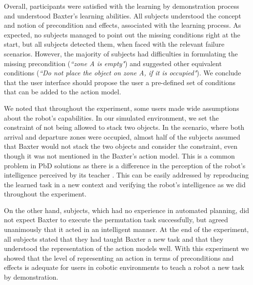 Overall, participants were satisfied with the learning by demonstration process and understood Baxter's learning abilities. All subjects understood the concept and notion of precondition and effects, associated with the learning process. As expected, no subjects managed to point out the missing conditions right at the start, but all subjects detected them, when faced with the relevant failure scenarios. However, the majority of subjects had difficulties in formulating the missing precondition (\textit{``zone A is empty"}) and suggested other equivalent conditions (\textit{``Do not place the object on zone A, if it is occupied"}). We conclude that the user interface should propose the user a pre-defined set of conditions that can be added to the action model.

We noted that throughout the experiment, some users made wide assumptions about the robot's capabilities. In our simulated environment, we set the constraint of not being allowed to stack two objects. In the scenario, where both arrival and departure zones were occupied, almost half of the subjects assumed that Baxter would not stack the two objects and consider the constraint, even though it was not mentioned in the Baxter's action model.
This is a common problem in PbD solutions as there is a difference in the perception of the robot's intelligence perceived by its teacher \cite{suay2012practical}. This can be easily addressed by reproducing the learned task in a new context and verifying the robot's intelligence as we did throughout the experiment.

On the other hand, subjects, which had no experience in automated planning, did not expect Baxter to execute the permutation task successfully, but agreed unanimously that it acted in an intelligent manner. At the end of the experiment, all subjects stated that they had taught Baxter a new task and that they understood the representation of the action models well. With this experiment we showed that the level of representing an action in terms of preconditions and effects is adequate for users in cobotic environments to teach a robot a new task by demonstration. 


%
%
%



